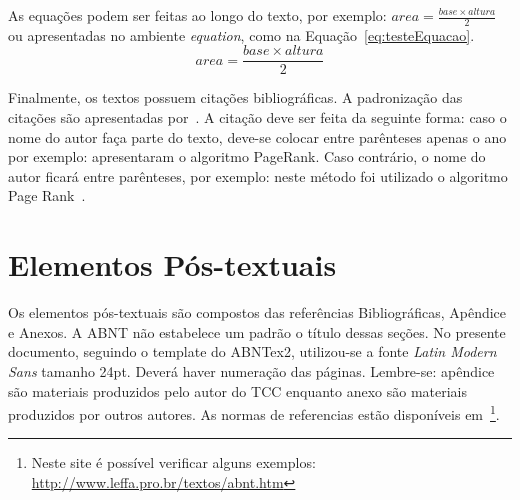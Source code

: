 As equações podem ser feitas ao longo do texto, por exemplo: $area = \frac{base \times altura}{2}$ ou apresentadas no ambiente \textit{equation}, como na Equação~\ref{eq:testeEquacao}.
\begin{equation}
	area = \frac{base \times altura}{2}
    \label{eq:testeEquacao}
\end{equation}

Finalmente, os textos possuem citações bibliográficas. A padronização das citações são apresentadas por~. A citação deve ser feita da seguinte forma: caso o nome do autor faça parte do texto, deve-se colocar entre parênteses apenas o ano por exemplo:  apresentaram o algoritmo PageRank. Caso contrário, o nome do autor ficará entre parênteses, por exemplo: neste método foi utilizado o algoritmo Page Rank~\cite{brin1998anatomy,abntCitacoes2002}.


\section{Elementos Pós-textuais}
\label{sec:posTextual}

Os elementos pós-textuais são compostos das referências Bibliográficas, Apêndice e Anexos. A ABNT não estabelece um padrão o título dessas seções. No presente documento, seguindo o template do ABNTex2, utilizou-se a fonte \textit{Latin Modern Sans} tamanho 24pt. Deverá haver numeração das páginas. Lembre-se: apêndice são materiais produzidos pelo autor do TCC enquanto anexo são materiais produzidos por outros autores. 
As normas de referencias estão disponíveis em~\cite{abntCitacoes2002}\footnote{Neste site é possível verificar alguns exemplos: \url{http://www.leffa.pro.br/textos/abnt.htm}}.